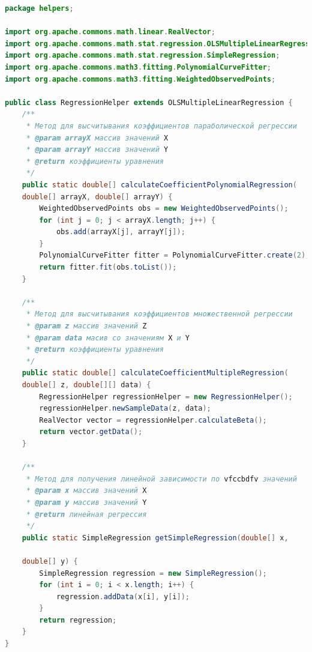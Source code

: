 \documentclass[a4paper,12pt]{article}
\begin{document}
\begin{lstlisting}[language=Java, title=Вспомогательный класс для вычисления различных видов регрессий]
package helpers;

import org.apache.commons.math.linear.RealVector;
import org.apache.commons.math.stat.regression.OLSMultipleLinearRegression;
import org.apache.commons.math.stat.regression.SimpleRegression;
import org.apache.commons.math3.fitting.PolynomialCurveFitter;
import org.apache.commons.math3.fitting.WeightedObservedPoints;

public class RegressionHelper extends OLSMultipleLinearRegression {
    /**
     * Метод для высчитывания коэффициентов параболической регрессии
     * @param arrayX массив значений X
     * @param arrayY массив значений Y
     * @return коэффициенты уравнения
     */
    public static double[] calculateCoefficientPolynomialRegression(
    double[] arrayX, double[] arrayY) {
        WeightedObservedPoints obs = new WeightedObservedPoints();
        for (int j = 0; j < arrayX.length; j++) {
            obs.add(arrayX[j], arrayY[j]);
        }
        PolynomialCurveFitter fitter = PolynomialCurveFitter.create(2);
        return fitter.fit(obs.toList());
    }

    /**
     * Метод для высчитывания коэффициентов множественной регрессии
     * @param z массив значений Z
     * @param data масив со значениям X и Y
     * @return коэффициенты уравнения
     */
    public static double[] calculateCoefficientMultipleRegression(
    double[] z, double[][] data) {
        RegressionHelper regressionHelper = new RegressionHelper();
        regressionHelper.newSampleData(z, data);
        RealVector vector = regressionHelper.calculateBeta();
        return vector.getData();
    }

    /**
     * Метод для получения линейной зависимости по vfccbdfv значений
     * @param x массив значений X
     * @param y массив значений Y
     * @return линейная регрессия
     */
    public static SimpleRegression getSimpleRegression(double[] x, 
    
    double[] y) {
        SimpleRegression regression = new SimpleRegression();
        for (int i = 0; i < x.length; i++) {
            regression.addData(x[i], y[i]);
        }
        return regression;
    }
}
\end{lstlisting}
\end{document}
